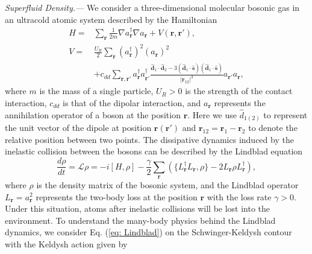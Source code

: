 \documentclass[aps,prl,twocolumn,superscriptaddress,]{revtex4-1}
\begin{document}

 

\emph{Superfluid Density.--- }We consider a three-dimensional
molecular bosonic gas in an ultracold atomic system \cite{Lahaye_2009,Chomaz_2023} described by the Hamiltonian
\begin{align}
	H=&\sum_{\bm{r}}\frac{1}{2m}\nabla a_{\bm{r}}^{\dagger}\nabla a_{\bm{r}}+V(\bm{r},\bm{r}'),\\
V=&\frac{U_{R}}{2}\sum_{\bm{r}}(a_{\bm{r}}^{\dagger})^{2}(a_{\bm{r}})^{2}\nonumber\\
  &+c_{dd}\sum_{\bm{r,\bm{r}'}}a_{\bm{r}}^{\dagger}a_{\bm{r'}}^{\dagger}\frac{\hat{\bm{d}}_1\cdot\hat{\bm{d}}_2-3(\hat{\bm{d}}_1\cdot\hat{\bm{s}})(\hat{\bm{d}}_1\cdot\hat{\bm{s}})}{|\bm{r}_{12}|^3}a_{\bm{r'}}a_{\bm{r}},
\end{align}
where $m$ is the mass of a single particle, $U_R>0$ is the strength of the contact interaction, $c_{dd}$ is that of the dipolar interaction, and $a_{\bm{\bm{r}}}$ represents the annihilation operator of a boson at the position $\bm{r}$. Here we use $\hat{d}_{1(2)}$ to represent the unit vector of the dipole at position $\bm{r}(\bm{r}')$ and $\bm{r}_{12}=\bm{r}_1-\bm{r}_2$ to denote the relative position between two points. %
The dissipative dynamics induced by the inelastic collision between the bosons can be described by the Lindblad equation \citep{10.1093/acprof:oso/9780199213900.001.0001,Nielsen2012}
\begin{equation}
\frac{d\rho}{dt}=\mathcal{L}\rho=-i[H,\rho]-\frac{\gamma}{2}\sum_{\bm{r}}(\{L_{\bm{r}}^{\dagger}L_{\bm{r}},\rho\}-2L_{\bm{r}}\rho L_{\bm{r}}^{\dagger}),\label{eq: Lindblad}
\end{equation}
where $\rho$ is the density matrix of the bosonic system, and the Lindblad operator $L_{\bm{r}}=a_{\bm{r}}^{2}$ represents
the two-body loss at the position $\bm{r}$ with the loss rate $\gamma>0$.
Under this situation, atoms after inelastic collisions will be lost into
the environment. To understand the many-body physics behind the Lindblad dynamics, we consider Eq.
(\ref{eq: Lindblad}) on the Schwinger-Keldysh contour with the Keldysh action given by \citep{Sieberer_2016}
\end{document}
